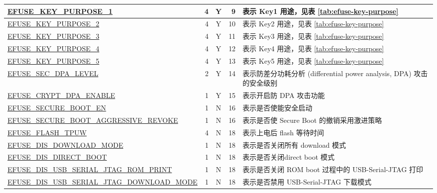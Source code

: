 \begin{longtable}[l]{ |m{8.2cm}|r|c|r|m{9.3cm}| }
    \hline
    \hyperref[fielddesc:EFUSEKEYPURPOSE1]{EFUSE\_KEY\_PURPOSE\_1} & 4 & Y & 9 & {表示 Key1 用途，见表 \ref{tab:efuse-key-purpose}} \\
    \hline
    \hyperref[fielddesc:EFUSEKEYPURPOSE2]{EFUSE\_KEY\_PURPOSE\_2} & 4 & Y & 10 & {表示 Key2 用途，见表 \ref{tab:efuse-key-purpose}} \\ 
    \hline
    \hyperref[fielddesc:EFUSEKEYPURPOSE3]{EFUSE\_KEY\_PURPOSE\_3} & 4 & Y & 11 & {表示 Key3 用途，见表 \ref{tab:efuse-key-purpose}} \\    
    \hline
    \hyperref[fielddesc:EFUSEKEYPURPOSE4]{EFUSE\_KEY\_PURPOSE\_4} & 4 & Y & 12 & {表示 Key4 用途，见表 \ref{tab:efuse-key-purpose}} \\    
    \hline
    \hyperref[fielddesc:EFUSEKEYPURPOSE5]{EFUSE\_KEY\_PURPOSE\_5} & 4 & Y & 13 & {表示 Key5 用途，见表 \ref{tab:efuse-key-purpose}} \\  
    \hline
    \hyperref[fielddesc:EFUSESECDPALEVEL]{EFUSE\_SEC\_DPA\_LEVEL} & 2 & Y & 14 & 表示防差分功耗分析 (differential power analysis, DPA)  攻击的安全级别\\ 
    \hline
    \hyperref[fielddesc:EFUSECRYPTDPAENABLE]{EFUSE\_CRYPT\_DPA\_ENABLE} & 1 & Y & 15 & 表示开启防 DPA 攻击功能 \\ 
    \hline
    \hyperref[fielddesc:EFUSESECUREBOOTEN]{EFUSE\_SECURE\_BOOT\_EN} & 1 & N & 16 & 表示是否使能安全启动 \\ 
    \hline
    \hyperref[fielddesc:EFUSESECUREBOOTAGGRESSIVEREVOKE]{EFUSE\_SECURE\_BOOT\_AGGRESSIVE\_REVOKE} & 1 & N & 16 & 表示是否使 Secure Boot 的撤销采用激进策略 \\
    \hline
    \hyperref[fielddesc:EFUSEFLASHTPUW]{EFUSE\_FLASH\_TPUW} & 4 & N & 18 & 表示上电后 flash 等待时间
    \\   
    \hline    
    \hyperref[fielddesc:EFUSEDISDOWNLOADMODE]{EFUSE\_DIS\_DOWNLOAD\_MODE} & 1 & N & 18 & 表示是否关闭所有 download 模式\\ 
    \hline
    \hyperref[fielddesc:EFUSEDISDIRECTBOOT]{EFUSE\_DIS\_DIRECT\_BOOT} & 1 & N & 18 & 表示是否关闭direct boot 模式\\
    \hline
    \hyperref[fielddesc:EFUSEDISUSBSERIALJTAGROMPRINT]{EFUSE\_DIS\_USB\_SERIAL\_JTAG\_ROM\_PRINT} & 1 & N & 18 & 表示是否关闭 ROM boot 过程中的 USB-Serial-JTAG 打印
    \\
    \hline 
    \hyperref[fielddesc:EFUSEDISUSBSERIALJTAGDOWNLOADMODE]{EFUSE\_DIS\_USB\_SERIAL\_JTAG\_DOWNLOAD\_MODE} & 1 & N & 18 & 表示是否禁用 USB-Serial-JTAG 下载模式 \\

\end{longtable}
